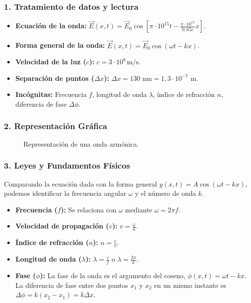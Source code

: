\subsubsection*{1. Tratamiento de datos y lectura}
\begin{itemize}
    \item \textbf{Ecuación de la onda:} $\vec{E}(x,t) = \vec{E}_0 \cos[\pi \cdot 10^{15}t - \frac{\pi \cdot 10^{15}}{0,65c}x]$.
    \item \textbf{Forma general de la onda:} $\vec{E}(x,t) = \vec{E}_0 \cos(\omega t - kx)$.
    \item \textbf{Velocidad de la luz ($c$):} $c=3\cdot10^8\,\text{m/s}$.
    \item \textbf{Separación de puntos ($\Delta x$):} $\Delta x = 130 \text{ nm} = 1,3 \cdot 10^{-7}$ m.
    \item \textbf{Incógnitas:} Frecuencia $f$, longitud de onda $\lambda$, índice de refracción $n$, diferencia de fase $\Delta\phi$.
\end{itemize}

\subsubsection*{2. Representación Gráfica}
\begin{figure}[H]
    \centering
    \caption{Representación de una onda armónica.}
\end{figure}

\subsubsection*{3. Leyes y Fundamentos Físicos}
Comparando la ecuación dada con la forma general $y(x,t) = A \cos(\omega t - kx)$, podemos identificar la frecuencia angular $\omega$ y el número de onda $k$.
\begin{itemize}
    \item \textbf{Frecuencia ($f$):} Se relaciona con $\omega$ mediante $\omega = 2\pi f$.
    \item \textbf{Velocidad de propagación ($v$):} $v = \frac{\omega}{k}$.
    \item \textbf{Índice de refracción ($n$):} $n = \frac{c}{v}$.
    \item \textbf{Longitud de onda ($\lambda$):} $\lambda = \frac{v}{f}$ o $\lambda = \frac{2\pi}{k}$.
    \item \textbf{Fase ($\phi$):} La fase de la onda es el argumento del coseno, $\phi(x,t) = \omega t - kx$. La diferencia de fase entre dos puntos $x_1$ y $x_2$ en un mismo instante es $\Delta\phi = k(x_2 - x_1) = k \Delta x$.
\end{itemize}

